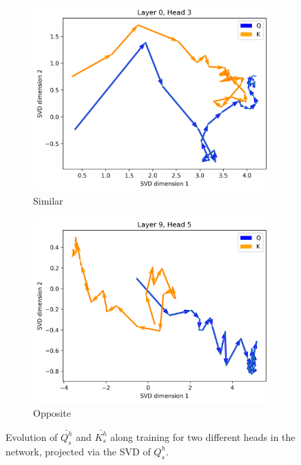 \begin{appendices}
\begin{figure}[ht!]
    \centering
    \begin{subfigure}[b]{0.48\columnwidth}
         \includegraphics[width=\linewidth]{sources/part_1/anisotropy/imgs/l0h3_samedir_QK_Q.png}
         \caption{Similar}
         \label{fig:QK_simdir_Q}
    \end{subfigure}
    \begin{subfigure}[b]{0.48\columnwidth}
         \includegraphics[width=\linewidth]{sources/part_1/anisotropy/imgs/l9h5_diffdir_QK_Q.png}
         \caption{Opposite}
         \label{fig:QK_diffdir_Q}
    \end{subfigure}
    \caption{Evolution of $\bar{Q^h_s}$ and $\bar{K^h_s}$ along training for two different heads in the network, projected via the SVD of $Q^h_s$.}
    \label{fig:QK_dir_Q}
\end{figure}


\end{appendices}
